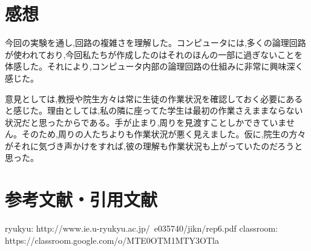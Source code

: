 \documentclass[a4paper,11pt,titlepage]{jarticle}
\begin{document}
\section{感想}
 今回の実験を通し,回路の複雑さを理解した。コンピュータには,多くの論理回路が使われており,今回私たちが作成したのはそれのほんの一部に過ぎないことを体感した。それにより,コンピュータ内部の論理回路の仕組みに非常に興味深く感じた。\par
意見としては,教授や院生方々は常に生徒の作業状況を確認しておく必要にあると感じた。理由としては,私の隣に座ってた学生は最初の作業さえままならない状況だと思ったからである。手が止まり,周りを見渡すことしかできていません。そのため,周りの人たちよりも作業状況が悪く見えました。仮に,院生の方々がそれに気づき声かけをすれば,彼の理解も作業状況も上がっていたのだろうと思った。\par

\section{参考文献・引用文献}
\begin{thebibliography}{99}
    ryukyu: http://www.ie.u-ryukyu.ac.jp/~e035740/jikn/rep6.pdf
    classroom: https://classroom.google.com/o/MTE0OTM1MTY3OTla
\end{thebibliography}
\end{document}
